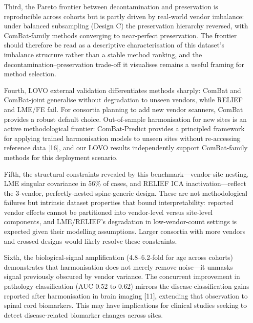 \documentclass[12pt,a4paper]{article}
\begin{document}
Third, the Pareto frontier between decontamination and preservation is reproducible across cohorts but is partly driven by real-world vendor imbalance: under balanced subsampling (Design C) the preservation hierarchy reversed, with ComBat-family methods converging to near-perfect preservation. The frontier should therefore be read as a descriptive characterisation of this dataset's imbalance structure rather than a stable method ranking, and the decontamination--preservation trade-off it visualises remains a useful framing for method selection.

Fourth, LOVO external validation differentiates methods sharply: ComBat and ComBat-joint generalise without degradation to unseen vendors, while RELIEF and LME/FE fail. For consortia planning to add new vendor scanners, ComBat provides a robust default choice. Out-of-sample harmonisation for new sites is an active methodological frontier: ComBat-Predict provides a principled framework for applying trained harmonisation models to unseen sites without re-accessing reference data [16], and our LOVO results independently support ComBat-family methods for this deployment scenario.

Fifth, the structural constraints revealed by this benchmark---vendor-site nesting, LME singular covariance in 56\% of cases, and RELIEF ICA inactivation---reflect the 3-vendor, perfectly-nested spine-generic design. These are not methodological failures but intrinsic dataset properties that bound interpretability: reported vendor effects cannot be partitioned into vendor-level versus site-level components, and LME/RELIEF's degradation in low-vendor-count settings is expected given their modelling assumptions. Larger consortia with more vendors and crossed designs would likely resolve these constraints.

Sixth, the biological-signal amplification (4.8--6.2-fold for age across cohorts) demonstrates that harmonisation does not merely remove noise---it unmasks signal previously obscured by vendor variance. The concurrent improvement in pathology classification (AUC 0.52 to 0.62) mirrors the disease-classification gains reported after harmonisation in brain imaging [11], extending that observation to spinal cord biomarkers. This may have implications for clinical studies seeking to detect disease-related biomarker changes across sites.
\end{document}
